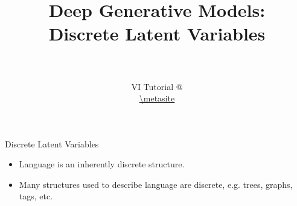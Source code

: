 \documentclass[14pt]{beamer}
\title[Discrete DGMs]{Deep Generative Models: \\
Discrete Latent Variables}
\date{}
\author[VI Tutorial @ \metahost]{ \metaauthor \\ 
~\\
VI Tutorial @ \metahost \\
\url{\metasite}
}
\begin{document}
\frame{\titlepage}

\begin{frame}{Discrete Latent Variables}
    \begin{itemize}
    	\item Language is an inherently discrete structure. \pause
    	\item Many structures used to describe language are discrete, e.g. trees, graphs, tags, etc.
    \end{itemize}
\end{frame}

\frame{\tableofcontents}


\end{document}
